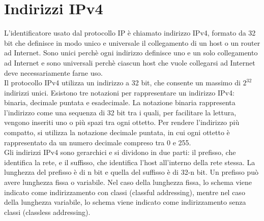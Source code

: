 \documentclass[12pt]{report}
\begin{document}
\section{Indirizzi IPv4}
L'identificatore usato dal protocollo IP è chiamato indirizzo IPv4, formato da 32 bit che definisce in modo unico e universale il collegamento di un host o un router ad Internet. Sono unici perchè ogni indirizzo definisce uno e un solo collegamento ad Internet e sono universali perchè ciascun host che vuole collegarsi ad Internet deve necessariamente farne uso.
\vspace{\baselineskip}\\
Il protocollo IPv4 utilizza un indirizzo a 32 bit, che consente un massimo di $2^{32}$ indirizzi unici. Esistono tre notazioni per rappresentare un indirizzo IPv4: binaria, decimale puntata e esadecimale. La notazione binaria rappresenta l'indirizzo come una sequenza di 32 bit tra i quali, per facilitare la lettura, vengono inseriti uno o più spazi tra ogni ottetto. Per rendere l'indirizzo più compatto, si utilizza la notazione decimale puntata, in cui ogni ottetto è rappresentato da un numero decimale compreso tra 0 e 255.
\vspace{\baselineskip}\\
Gli indirizzi IPv4 sono gerarchici e si dividono in due parti: il prefisso, che identifica la rete, e il suffisso, che identifica l'host all'interno della rete stessa. La lunghezza del prefisso è di n bit e quella del suffisso è di 32-n bit. Un prefisso può avere lunghezza fissa o variabile. Nel caso della lunghezza fissa, lo schema viene indicato come indirizzamento con classi (classful addressing), mentre nel caso della lunghezza variabile, lo schema viene indicato come indirizzamento senza classi (classless addressing).
\end{document}
